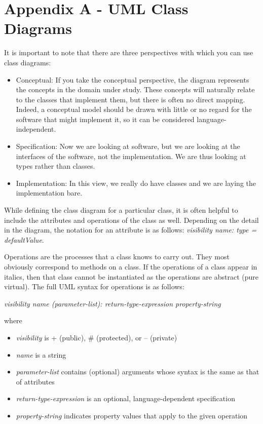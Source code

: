 \documentclass[11pt]{article}
\begin{document}
\newpage
\section*{Appendix A - UML Class Diagrams}

It is important to note that there are three perspectives with which you
can use class diagrams: 

\begin{itemize}

\item Conceptual: If you take the conceptual perspective, the diagram
represents the concepts in the domain under study. These concepts will
naturally relate to the classes that implement them, but there is often no 
direct mapping. Indeed, a conceptual model should be drawn with little or
no regard for the software that might implement it, so it can be considered 
language-independent.

\item Specification: Now we are looking at software, but we are looking at 
the interfaces of the software, not the implementation. We are thus
looking at types rather than classes. 

\item Implementation: In this view, we really do have classes and we are
laying the implementation bare. 

\end{itemize}

While defining the class diagram for a particular class, it is often
helpful to include the attributes and operations of the class as well.
Depending on the detail in the diagram, the notation for an attribute is
as follows: \emph{visibility name: type = defaultValue}.

Operations are the processes that a class knows to carry out. They most
obviously correspond to methods on a class. If the operations of a class
appear in italics, then that class cannot be instantiated as the
operations are abstract (pure virtual). The full UML syntax for
operations is as follows:\\
\begin{center}
\emph{visibility name (parameter-list): return-type-expression {property-string}}
\end{center}

\noindent
where

\begin{itemize}

\item \emph{visibility} is + (public), \# (protected), or -- (private)
\item \emph{name} is a string
\item \emph{parameter-list} contains (optional) arguments whose syntax
      is the same as that of attributes
\item \emph{return-type-expression} is an optional, language-dependent
      specification 
\item \emph{property-string} indicates property values that apply to the
      given operation 
\end{itemize}
\end{document}
